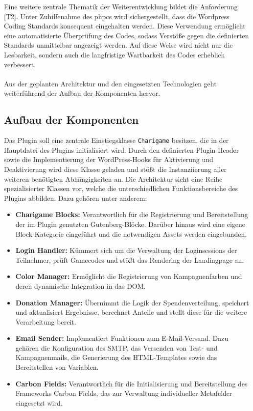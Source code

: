 Eine weitere zentrale Thematik der Weiterentwicklung bildet die Anforderung [T2].
Unter Zuhilfenahme des \gls{phpcs} wird sichergestellt, dass die Wordpress Coding Standards konsequent eingehalten werden.
Diese Verwendung ermöglicht eine automatisierte Überprüfung des Codes, sodass Verstöße gegen die definierten Standards unmittelbar angezeigt werden.
Auf diese Weise wird nicht nur die Lesbarkeit, sondern auch die langfristige Wartbarkeit des Codes erheblich verbessert.
\\\\
Aus der geplanten Architektur und den eingesetzten Technologien geht weiterführend der Aufbau der Komponenten hervor.

\subsection{Aufbau der Komponenten}
Das Plugin soll eine zentrale Einstiegsklasse \texttt{Charigame} besitzen, die in der Hauptdatei des Plugins initialisiert wird.
Durch den definierten Plugin-Header sowie die Implementierung der WordPress-Hooks für Aktivierung und Deaktivierung wird diese Klasse geladen und stößt die Instanziierung aller weiteren benötigten Abhängigkeiten an.
Die Architektur sieht eine Reihe spezialisierter Klassen vor, welche die unterschiedlichen Funktionsbereiche des Plugins abbilden.
Dazu gehören unter anderem:

\begin{itemize}
    \item \textbf{Charigame Blocks:} Verantwortlich für die Registrierung und Bereitstellung der im Plugin genutzten Gutenberg-Blöcke. Darüber hinaus wird eine eigene Block-Kategorie eingeführt und die notwendigen Assets werden eingebunden.
    \item \textbf{Login Handler:} Kümmert sich um die Verwaltung der Loginsessions der Teilnehmer, prüft Gamecodes und stößt das Rendering der Landingpage an.
    \item \textbf{Color Manager:} Ermöglicht die Registrierung von Kampagnenfarben und deren dynamische Integration in das DOM.
    \item \textbf{Donation Manager:} Übernimmt die Logik der Spendenverteilung, speichert und aktualisiert Ergebnisse, berechnet Anteile und stellt diese für die weitere Verarbeitung bereit.
    \item \textbf{Email Sender:} Implementiert Funktionen zum E-Mail-Versand. Dazu gehören die Konfiguration des SMTP, das Versenden von Test- und Kampagnenmails, die Generierung des HTML-Templates sowie das Bereitstellen von Variablen.
    \item \textbf{Carbon Fields:} Verantwortlich für die Initialisierung und Bereitstellung des Frameworks Carbon Fields, das zur Verwaltung individueller Metafelder eingesetzt wird.
\end{itemize}

